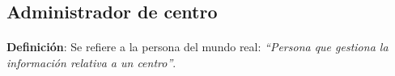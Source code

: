 \subsection{Administrador de centro}

  \paragraph{}\textbf{Definición}: Se refiere a la persona del mundo real:
  \emph{``Persona  que gestiona la información relativa a un centro''}.



